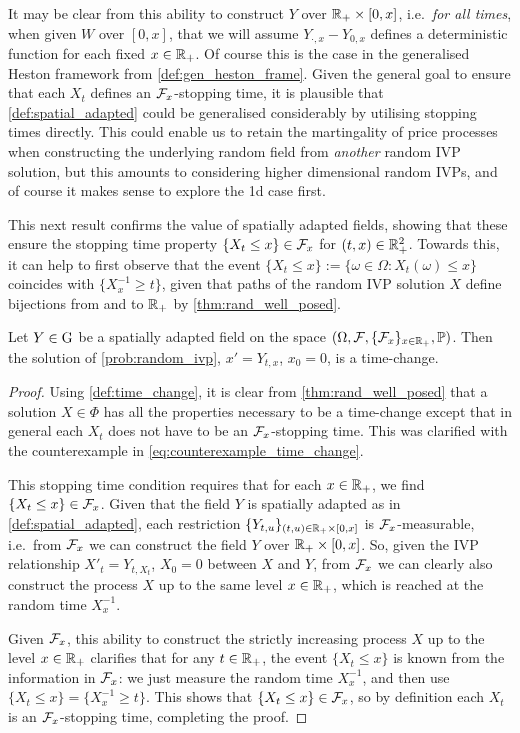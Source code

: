 It may be clear from this ability to construct $Y$ over $\mathbb{R}_+\times[0,x]$, i.e.~\emph{for all times}, when given $W$ over $[0,x]$, that we will assume $Y_{\cdot,x} - Y_{0,x}$ defines a deterministic function for each fixed $x\in\mathbb{R}_+$. Of course this is the case in the generalised Heston framework from \autoref{def:gen_heston_frame}. Given the general goal to ensure that each $X_t$ defines an $\mathcal{F}_x$-stopping time, it is plausible that \autoref{def:spatial_adapted} could be generalised considerably by utilising stopping times directly. This could enable us to retain the martingality of price processes when constructing the underlying random field from \emph{another} random IVP solution, but this amounts to considering higher dimensional random IVPs, and of course it makes sense to explore the 1d case first.

This next result confirms the value of spatially adapted fields, showing that these ensure the stopping time property $\{X_t \le x\}\in\mathcal{F}_x$ for $(t,x)\in\mathbb{R}_+^2$. Towards this, it can help to first observe that the event $\{X_t \le x\}:=\{\omega\in\Omega:X_t(\omega) \le x\}$ coincides with $\{X^{-1}_x\ge t\}$, given that paths of the random IVP solution $X$ define bijections from and to $\mathbb{R}_+$ by \autoref{thm:rand_well_posed}.

\begin{lemma}\label{lem:time_change_soln}
    Let $Y\in\mathrm{G}$ be a spatially adapted field on the space $(\Omega,\mathcal{F},\{\mathcal{F}_x\}_{x\in\mathbb{R}_+},\mathbb{P})$. Then the solution of \autoref{prob:random_ivp}, $x'=Y_{t,x}$, $x_0=0$, is a time-change.
\end{lemma}
\begin{proof}
    Using \autoref{def:time_change}, it is clear from \autoref{thm:rand_well_posed} that a solution $X\in\Phi$ has all the properties necessary to be a time-change except that in general each $X_t$ does not have to be an $\mathcal{F}_x$-stopping time. This was clarified with the counterexample in \autoref{eq:counterexample_time_change}.

    This stopping time condition requires that for each $x\in\mathbb{R}_+$, we find $\{X_t \le x\}\in\mathcal{F}_x$. Given that the field $Y$ is spatially adapted as in \autoref{def:spatial_adapted}, each restriction $\{Y_{t,u}\}_{(t,u)\in\mathbb{R}_+\times[0,x]}$ is $\mathcal{F}_x$-measurable, i.e.~from $\mathcal{F}_x$ we can construct the field $Y$ over $\mathbb{R}_+\times[0,x]$. So, given the IVP relationship $X'_t=Y_{t,X_t}$, $X_0=0$ between $X$ and $Y$, from $\mathcal{F}_x$ we can clearly also construct the process $X$ up to the same level $x\in\mathbb{R}_+$, which is reached at the random time $X^{-1}_x$.

    Given $\mathcal{F}_x$, this ability to construct the strictly increasing process $X$ up to the level $x\in\mathbb{R}_+$ clarifies that for any $t\in\mathbb{R}_+$, the event $\{X_t \le x\}$ is known from the information in $\mathcal{F}_x$: we just measure the random time $X^{-1}_x$, and then use $\{X_t \le x\} = \{X^{-1}_x\ge t\}$. This shows that $\{X_t \le x\}\in\mathcal{F}_x$, so by definition each $X_t$ is an $\mathcal{F}_x$-stopping time, completing the proof.
\end{proof}

